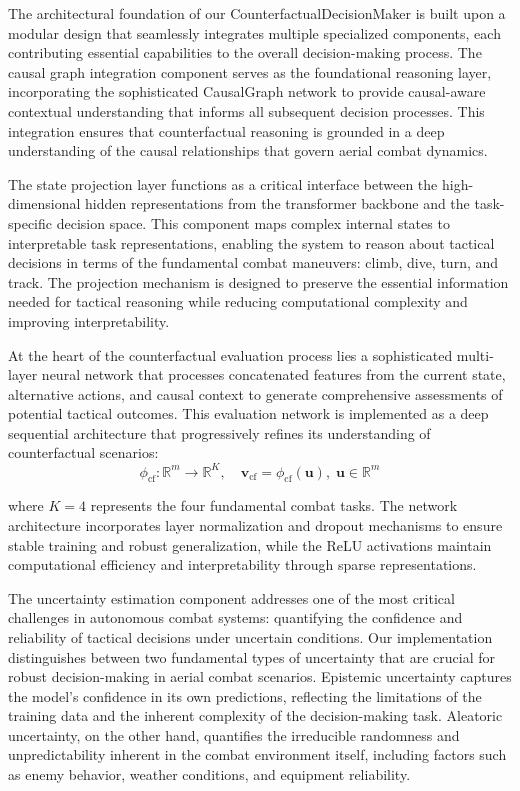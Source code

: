 \documentclass[12pt]{article}
\begin{document}
The architectural foundation of our CounterfactualDecisionMaker is built upon a modular design that seamlessly integrates multiple specialized components, each contributing essential capabilities to the overall decision-making process. The causal graph integration component serves as the foundational reasoning layer, incorporating the sophisticated CausalGraph network to provide causal-aware contextual understanding that informs all subsequent decision processes. This integration ensures that counterfactual reasoning is grounded in a deep understanding of the causal relationships that govern aerial combat dynamics.

The state projection layer functions as a critical interface between the high-dimensional hidden representations from the transformer backbone and the task-specific decision space. This component maps complex internal states to interpretable task representations, enabling the system to reason about tactical decisions in terms of the fundamental combat maneuvers: climb, dive, turn, and track. The projection mechanism is designed to preserve the essential information needed for tactical reasoning while reducing computational complexity and improving interpretability.

At the heart of the counterfactual evaluation process lies a sophisticated multi-layer neural network that processes concatenated features from the current state, alternative actions, and causal context to generate comprehensive assessments of potential tactical outcomes. This evaluation network is implemented as a deep sequential architecture that progressively refines its understanding of counterfactual scenarios:
\begin{equation}
\phi_{\mathrm{cf}}:\mathbb{R}^{m}\to\mathbb{R}^{K},\quad \mathbf{v}_{\mathrm{cf}}=\phi_{\mathrm{cf}}(\mathbf{u}),\; \mathbf{u}\in\mathbb{R}^{m}
\end{equation}

where $K=4$ represents the four fundamental combat tasks. The network architecture incorporates layer normalization and dropout mechanisms to ensure stable training and robust generalization, while the ReLU activations maintain computational efficiency and interpretability through sparse representations.

The uncertainty estimation component addresses one of the most critical challenges in autonomous combat systems: quantifying the confidence and reliability of tactical decisions under uncertain conditions. Our implementation distinguishes between two fundamental types of uncertainty that are crucial for robust decision-making in aerial combat scenarios. Epistemic uncertainty captures the model's confidence in its own predictions, reflecting the limitations of the training data and the inherent complexity of the decision-making task. Aleatoric uncertainty, on the other hand, quantifies the irreducible randomness and unpredictability inherent in the combat environment itself, including factors such as enemy behavior, weather conditions, and equipment reliability.
\end{document}
